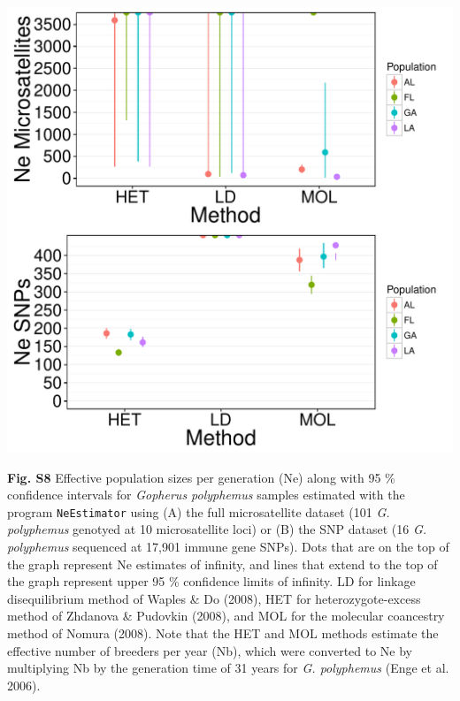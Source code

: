 \documentclass[english]{article}\usepackage[]{graphicx}\usepackage[]{color}
\makeatletter
\def\maxwidth{ %
  \ifdim\Gin@nat@width>\linewidth
    \linewidth
  \else
    \Gin@nat@width
  \fi
}
\newenvironment{knitrout}{}{} %
\makeatother
\begin{document}
\begin{knitrout}
\color{fgcolor}
\includegraphics[width=\maxwidth]{figure/Figure_S8-1} 

\end{knitrout}
\noindent
\textbf{Fig. S8} Effective population sizes per generation (Ne) along with 95 \% confidence intervals for \textit{Gopherus polyphemus} samples estimated with the program \texttt{NeEstimator} using (A) the full microsatellite dataset (101 \textit{G. polyphemus} genotyed at 10 microsatellite loci) or (B) the SNP dataset (16 \textit{G. polyphemus} sequenced at 17,901 immune gene SNPs). Dots that are on the top of the graph represent Ne estimates of infinity, and lines that extend to the top of the graph represent upper 95 \% confidence limits of infinity. LD for linkage disequilibrium method of Waples \& Do (2008), HET for heterozygote-excess method of Zhdanova \& Pudovkin (2008), and MOL for the molecular coancestry method of Nomura (2008). Note that the HET and MOL methods estimate the effective number of breeders per year (Nb), which were converted to Ne by multiplying Nb by the generation time of 31 years for \textit{G. polyphemus} (Enge et al. 2006).\\
\end{document}
